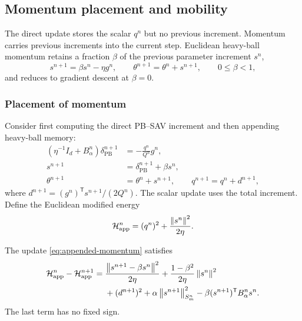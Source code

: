 \subsection{Momentum placement and mobility}
\label{sec:monotone-mobility}

The direct update stores the scalar \(q^n\) but no previous increment. Momentum
carries previous increments into the current step. Euclidean heavy-ball momentum \cite{polyak1964} retains a fraction
\(\beta\) of the previous parameter increment \(s^n\),
\begin{equation}
  s^{n+1}=\beta s^n-\eta g^n,\qquad
  \theta^{n+1}=\theta^n+s^{n+1},\qquad 0\leq\beta<1,
  \label{eq:heavy-ball-step}
\end{equation}
and reduces to gradient descent at \(\beta=0\).

\subsubsection{Placement of momentum}

Consider first computing the direct PB--SAV increment and then appending
heavy-ball memory:
\begin{subequations}
\label{eq:appended-momentum}
\begin{align}
  \left(\eta^{-1}I_d+B_\alpha^n\right)\delta_{\mathrm{PB}}^{n+1}
  &=-\frac{q^n}{Q^n}g^n,
  \label{eq:appended-base-step}\\
  s^{n+1}&=\delta_{\mathrm{PB}}^{n+1}+\beta s^n,\\
  \theta^{n+1}&=\theta^n+s^{n+1},
  \qquad q^{n+1}=q^n+d^{n+1},
\end{align}
\end{subequations}
where \(d^{n+1}=(g^n)^{\mathsf T}s^{n+1}/(2Q^n)\). The scalar update uses
the total increment. Define the Euclidean modified energy
\begin{equation}
  \mathcal{H}_{\mathrm{app}}^n=(q^n)^2+\frac{\left\lVert s^n\right\rVert^2}{2\eta}.
  \label{eq:appended-energy}
\end{equation}

\begin{proposition}
\label{prop:appended-momentum-defect}
The update \cref{eq:appended-momentum} satisfies
\begin{equation}
\begin{aligned}
  \mathcal{H}_{\mathrm{app}}^n-\mathcal{H}_{\mathrm{app}}^{n+1}
  ={}&\frac{\left\lVert s^{n+1}-\beta s^n\right\rVert^2}{2\eta}
  +\frac{1-\beta^2}{2\eta}\left\lVert s^n\right\rVert^2\\
  &+(d^{n+1})^2+\alpha\left\lVert s^{n+1}\right\rVert_{S_m^n}^2
  -\beta(s^{n+1})^{\mathsf T}B_\alpha^n s^n.
\end{aligned}
\label{eq:appended-momentum-defect}
\end{equation}
The last term has no fixed sign.
\end{proposition}

